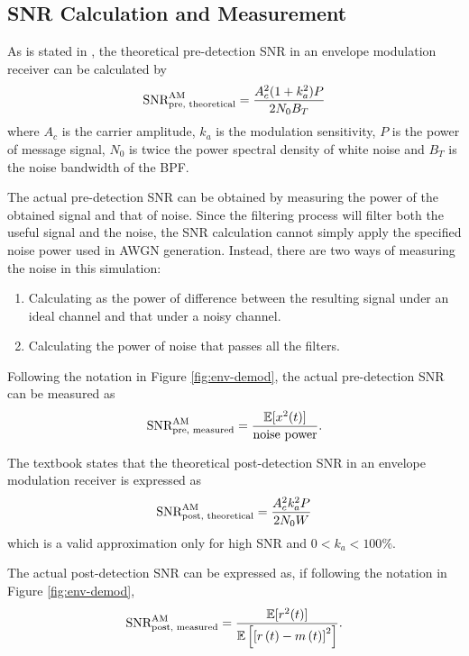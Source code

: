 \documentclass[../ECE459FinalProjectReport.tex]{subfiles}
\begin{document}
\subsection{SNR Calculation and Measurement}
As is stated in \textcite[Eq. (9.26)]{haykinIntroductionAnalogDigital2007}, the theoretical pre-detection SNR in an envelope modulation receiver can be calculated by
\begin{equation}
    \text{SNR}_{\text{pre, theoretical}}^{\text{AM}} = \frac{A_c^2 (1+k_a^2)P}{2N_0 B_T}
\end{equation}
where $A_c$ is the carrier amplitude, $k_a$ is the modulation sensitivity, $P$ is the power of message signal, $N_0$ is twice the power spectral density of white noise and $B_T$ is the noise bandwidth of the BPF.

The actual pre-detection SNR can be obtained by measuring the power of the obtained signal and that of noise. Since the filtering process will filter both the useful signal and the noise, the SNR calculation cannot simply apply the specified noise power used in AWGN generation. Instead, there are two ways of measuring the noise in this simulation:
\begin{enumerate}
    \item Calculating as the power of difference between the resulting signal under an ideal channel and that under a noisy channel.
    \item Calculating the power of noise that passes all the filters.
\end{enumerate}

Following the notation in Figure \ref{fig:env-demod}, the actual pre-detection SNR can be measured as
\begin{equation}
    \text{SNR}_{\text{pre, measured}}^{\text{AM}} = \frac{\mathbb{E}[x^2(t)]}{\text{noise power}}.
\end{equation}

The textbook \cite[Eq. (9.23)]{haykinIntroductionAnalogDigital2007} states that the theoretical post-detection SNR in an envelope modulation receiver is expressed as
\begin{equation}
    \text{SNR}_{\text{post, theoretical}}^{\text{AM}} = \frac{A_c^2 k_a^2 P}{2N_0 W}
\end{equation}
which is a valid approximation only for high SNR and $0<k_a<100\%$.

The actual post-detection SNR can be expressed as, if following the notation in Figure \ref{fig:env-demod},
\begin{equation}
    \text{SNR}_{\text{post, measured}}^{\text{AM}} = \frac{\mathbb{E}[r^2(t)]}{\mathbb{E}\left[ \left[ r\left(t\right) - m\left(t\right) \right]^2 \right]}.
\end{equation}
\end{document}
